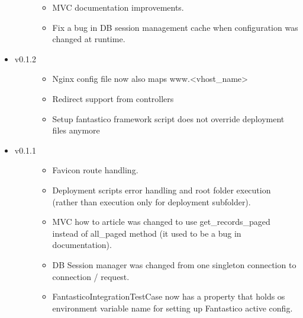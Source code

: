 \documentclass[letterpaper,10pt,english]{sphinxmanual}
\begin{document}
\begin{itemize}
\begin{description}
\begin{itemize}
\item {} 
MVC documentation improvements.

\item {} 
Fix a bug in DB session management cache when configuration was changed at runtime.

\end{itemize}

\end{description}

\item {} \begin{description}
\item[{v0.1.2}] \leavevmode\begin{itemize}
\item {} 
Nginx config file now also maps www.\textless{}vhost\_name\textgreater{}

\item {} 
Redirect support from controllers

\item {} 
Setup fantastico framework script does not override deployment files anymore

\end{itemize}

\end{description}

\item {} \begin{description}
\item[{v0.1.1}] \leavevmode\begin{itemize}
\item {} 
Favicon route handling.

\item {} 
Deployment scripts error handling and root folder execution (rather than execution only for deployment subfolder).

\item {} 
MVC how to article was changed to use get\_records\_paged instead of all\_paged method (it used to be a bug in documentation).

\item {} 
DB Session manager was changed from one singleton connection to connection / request.

\item {} 
FantasticoIntegrationTestCase now has a property that holds os environment variable name for setting up Fantastico active config.

\end{itemize}


\end{description}
\end{itemize}
\end{document}
